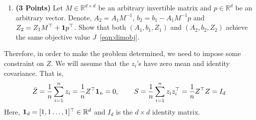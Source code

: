 \documentclass[a4paper]{article}
\newcommand*{\one}{{\bf 1}}
\newcommand{\Zbar}{\bar{Z}}
\theoremstyle{definition}
\newcommand{\RR}{\mathbb{R}}
\begin{document}
\begin{enumerate}


\item \textbf{(3 Points)}
Let $M\in\RR^{d\times d}$ be an arbitrary invertible matrix and $p\in\RR^{d}$ be an arbitrary vector.
Denote, $A_2 = A_1M^{-1}$, $b_2 = b_1- A_1M^{-1}p$ and $Z_2 = Z_1 M^\top +
\one p^\top$.
Show that both
$(A_1, b_1, Z_1)$ and $(A_2, b_2, Z_2)$ achieve the same objective value $J$~\eqref{eqn:dimobj}.
\end{enumerate}

Therefore, in order to make the problem determined, we need to impose some
constraint on $Z$. We will assume that the $z_i$'s have zero mean and identity covariance.
That is,
\begin{align*}
\Zbar = \frac{1}{n} \sum_{i=1}^n z_i =\frac{1}{n} Z^\top {\bf 1}_n = 0, \hspace{0.3in} 
S = \frac{1}{n} \sum_{i=1}^n z_i z_i^\top 
= \frac{1}{n} Z^\top Z
= I_d
\end{align*}
Here, ${\bf 1}_d = [1, 1 \dots, 1]^\top \in\RR^d$ and $I_d$  is the $d\times d$ identity matrix.
\end{document}
